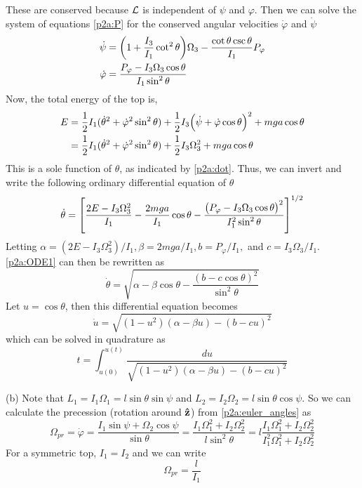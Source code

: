 \documentclass[12pt]{article}
\begin{document}
\begin{problem}{2}
\begin{solution}
\begin{subequations}
\end{subequations}
These are conserved because $\mathcal{L}$ is independent of $\psi$ and $\varphi$. Then 
we can solve the system of equations \eqref{p2a:P} for the conserved
angular velocities $\dot\varphi$ and $\dot\psi$
\begin{subequations}\label{p2a:dot}
    \begin{align}
        \dot\psi&=\qty(1+\frac{I_3}{I_1}\cot^2\theta)\Omega_3
        -\frac{\cot\theta\csc\theta}{I_1}P_\varphi\\
        \dot\varphi&=\frac{P_\varphi-I_3\Omega_3\cos\theta}{I_1\sin^2\theta}
        \label{p2a:varphidot}
    \end{align} 
\end{subequations}
Now, the total energy of the top is,
\begin{align}
    E
    &=\frac12I_1(\dot\theta^2+\dot\varphi^2\sin^2\theta)
    +\frac12I_3\qty(\dot\psi+\dot\varphi\cos\theta)^2+mga\cos\theta \notag\\
    &=\frac12I_1(\dot\theta^2+\dot\varphi^2\sin^2\theta)
    +\frac12I_3\Omega_3^2+mga\cos\theta
\end{align}
This is a sole function of $\theta$, as indicated by \eqref{p2a:dot}. Thus, we
can invert and write the following ordinary differential equation of $\theta$
\begin{equation}\label{p2a:ODE1}
    \dot\theta=\qty[\frac{2E-I_3\Omega_3^2}{I_1}-\frac{2mga}{I_1}\cos\theta
    -\frac{\qty(P_\varphi-I_3\Omega_3\cos\theta)^2}{I_1^2\sin^2\theta}]^{1/2} 
\end{equation}
Letting $\alpha=(2E-I_3\Omega_3^2) /I_1,\beta=2mga /I_1,b=P_\varphi /I_1,$ and
$c=I_3\Omega_3 /I_1$. \eqref{p2a:ODE1} can then be rewritten as
\begin{equation}\label{p2a:thetadot}
    \dot\theta=\sqrt{\alpha-\beta\cos\theta-\frac{(b-c\cos\theta)^2}{\sin^2\theta}} 
\end{equation}
Let $u=\cos\theta$, then this differential equation becomes
\begin{equation}
    \dot{u}=\sqrt{(1-u^2)(\alpha-\beta u)-(b-cu)^2} 
\end{equation}
which can be solved in quadrature as
\begin{equation}
    t=\int_{u(0)}^{u(t)}\frac{du}{\sqrt{(1-u^2)(\alpha-\beta u)-(b-cu)^2}} 
\end{equation}

(b) Note that $L_1=I_1\Omega_1=l\sin\theta\sin\psi$ and
$L_2=I_2\Omega_2=l\sin\theta\cos\psi$. So we can calculate the precession
(rotation around $\vb{\hat{z}}$) from \eqref{p2a:euler_angles} as
\begin{equation}
    \Omega_{pr}=\dot\varphi=\frac{I_1\sin\psi+\Omega_2\cos\psi}{\sin\theta} 
    =\frac{I_1\Omega_1^2+I_2\Omega_2^2}{l\sin^2\theta}
    =l\frac{I_1\Omega_1^2+I_2\Omega_2^2}{I_1^2\Omega_1^2+I_2\Omega_2^2}
\end{equation}
For a symmetric top, $I_1=I_2$ and we can write
\begin{equation}\label{p2b:precession}
    \Omega_{pr}=\frac{l}{I_1} 
\end{equation}


\end{solution}
\end{problem}
\end{document}
